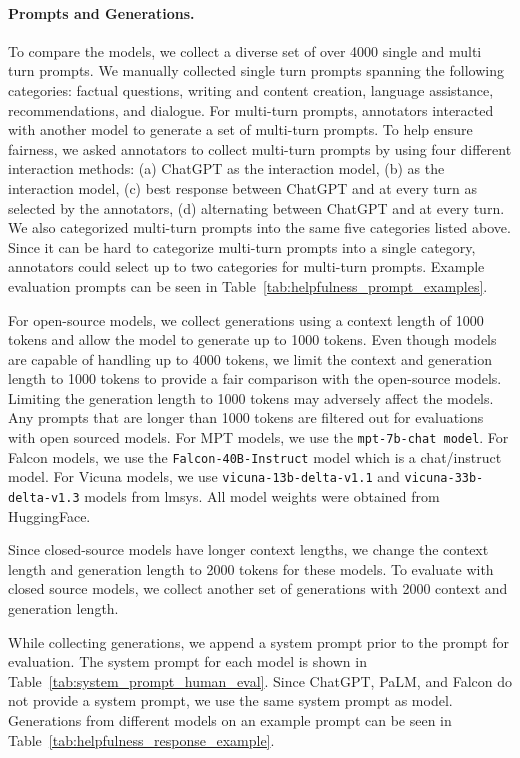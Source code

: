 \paragraph{Prompts and Generations.}
To compare the models, we collect a diverse set of over 4000 single and multi turn prompts. We manually collected single turn prompts spanning the following categories: factual questions, writing and content creation, language assistance, recommendations, and dialogue. For multi-turn prompts, annotators interacted with another model to generate a set of multi-turn prompts. To help ensure fairness, we asked annotators to collect multi-turn prompts by using four different interaction methods: (a) ChatGPT as the interaction model, (b) \modelname as the interaction model, (c) best response between ChatGPT and \modelname at every turn as selected by the annotators, (d) alternating between ChatGPT and \modelname at every turn. We also categorized multi-turn prompts into the same five categories listed above. Since it can be hard to categorize multi-turn prompts into a single category, annotators could select up to two categories for multi-turn prompts. Example evaluation prompts can be seen in Table~\ref{tab:helpfulness_prompt_examples}.

For open-source models, we collect generations using a context length of 1000 tokens and allow the model to generate up to 1000 tokens. Even though \modelname models are capable of handling up to 4000 tokens, we limit the context and generation length to 1000 tokens to provide a fair comparison with the open-source models. Limiting the generation length to 1000 tokens may adversely affect the \modelname models. Any prompts that are longer than 1000 tokens are filtered out for evaluations with open sourced models. For MPT models, we use the \texttt{mpt-7b-chat model}. For Falcon models, we use the \texttt{Falcon-40B-Instruct} model which is a chat/instruct model. For Vicuna models, we use \texttt{vicuna-13b-delta-v1.1} and \texttt{vicuna-33b-delta-v1.3} models from lmsys. All model weights were obtained from HuggingFace.

Since closed-source models have longer context lengths, we change the context length and generation length to 2000 tokens for these models. To evaluate with closed source models, we collect another set of generations with 2000 context and generation length.

While collecting generations, we append a system prompt prior to the prompt for evaluation. The system prompt for each model is shown in Table~\ref{tab:system_prompt_human_eval}. Since ChatGPT, PaLM, and Falcon do not provide a system prompt, we use the same system prompt as \modelname model. Generations from different models on an example prompt can be seen in Table~\ref{tab:helpfulness_response_example}.

